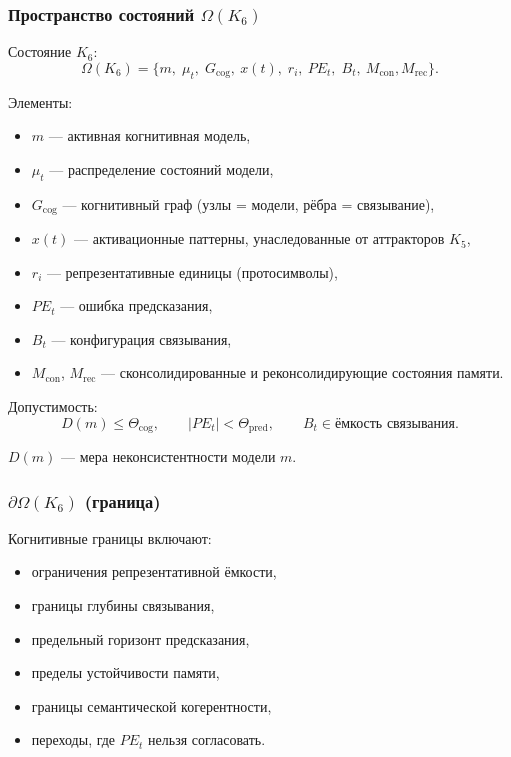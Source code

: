 \subsubsection{Пространство состояний \texorpdfstring{$\Omega(K_6)$}{\Omega(K_6)}}

Состояние $K_6$:
\[
\Omega(K_6) =
\{
m,\; \mu_t,\; G_{\mathrm{cog}},\
x(t),\; r_i,\
PE_t,\; B_t,\
M_{\mathrm{con}}, M_{\mathrm{rec}}
\}.
\]

Элементы:
\begin{itemize}
    \item $m$ — активная когнитивная модель,
    \item $\mu_t$ — распределение состояний модели,
    \item $G_{\mathrm{cog}}$ — когнитивный граф (узлы = модели, рёбра = связывание),
    \item $x(t)$ — активационные паттерны, унаследованные от аттракторов $K_5$,
    \item $r_i$ — репрезентативные единицы (протосимволы),
    \item $PE_t$ — ошибка предсказания,
    \item $B_t$ — конфигурация связывания,
    \item $M_{\mathrm{con}}$, $M_{\mathrm{rec}}$ — сконсолидированные и
          реконсолидирующие состояния памяти.
\end{itemize}

Допустимость:
\[
D(m) \le \Theta_{\mathrm{cog}}, \qquad
|PE_t| < \Theta_{\mathrm{pred}}, \qquad
B_t \in \text{ёмкость связывания}.
\]

$D(m)$ — мера неконсистентности модели $m$.

\subsubsection{\texorpdfstring{$\partial\Omega(K_6)$}{\partial\Omega(K_6)} (граница)}

Когнитивные границы включают:
\begin{itemize}
    \item ограничения репрезентативной ёмкости,
    \item границы глубины связывания,
    \item предельный горизонт предсказания,
    \item пределы устойчивости памяти,
    \item границы семантической когерентности,
    \item переходы, где $PE_t$ нельзя согласовать.
\end{itemize}

